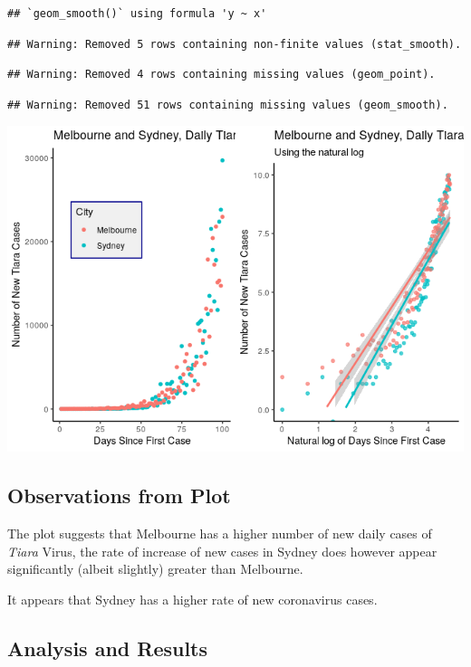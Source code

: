 \documentclass{article}
\begin{document}
\begin{lstlisting}
## `geom_smooth()` using formula 'y ~ x'
\end{lstlisting}

\begin{lstlisting}
## Warning: Removed 5 rows containing non-finite values (stat_smooth).
\end{lstlisting}

\begin{lstlisting}
## Warning: Removed 4 rows containing missing values (geom_point).
\end{lstlisting}

\begin{lstlisting}
## Warning: Removed 51 rows containing missing values (geom_smooth).
\end{lstlisting}

\includegraphics{main_files/figure-html/unnamed-chunk-19-1.png}

\hypertarget{observations-from-plot-4}{%
\subsection{Observations from Plot}\label{observations-from-plot-4}}

The plot suggests that Melbourne has a higher number of new daily cases
of \emph{Tiara} Virus, the rate of increase of new cases in Sydney does
however appear significantly (albeit slightly) greater than Melbourne.

It appears that Sydney has a higher rate of new coronavirus cases.

\hypertarget{analysis-and-results-4}{%
\subsection{Analysis and Results}\label{analysis-and-results-4}}
\end{document}
